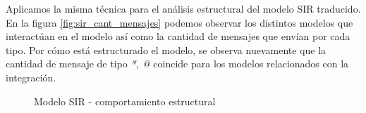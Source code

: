 Aplicamos la misma técnica para el análisis estructural del modelo SIR traducido.
En la figura \ref{fig:sir_cant_mensajes} podemos observar los distintos modelos
que interactúan en el modelo así como la cantidad de mensajes que envían por
cada tipo.
Por cómo está estructurado el modelo, se observa nuevamente que la cantidad de
mensaje de tipo \textit{*, @} coincide para los modelos relacionados con la
integración. 

\begin{figure}[H]
	\centering     %
        \caption{Modelo SIR - comportamiento estructural}
\end{figure}
